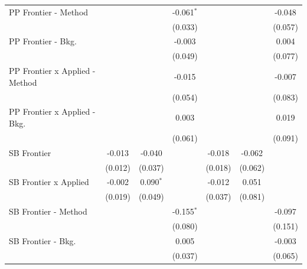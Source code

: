 \begin{tabular}{lcccccc}
   PP Frontier - Method           &              &             & -0.061$^{*}$ &              &                & -0.048\\   
                                  &              &             & (0.033)      &              &                & (0.057)\\   
   PP Frontier - Bkg.             &              &             & -0.003       &              &                & 0.004\\   
                                  &              &             & (0.049)      &              &                & (0.077)\\   
   PP Frontier x Applied - Method &              &             & -0.015       &              &                & -0.007\\   
                                  &              &             & (0.054)      &              &                & (0.083)\\   
   PP Frontier x Applied - Bkg.   &              &             & 0.003        &              &                & 0.019\\   
                                  &              &             & (0.061)      &              &                & (0.091)\\   
   SB Frontier                    & -0.013       & -0.040      &              & -0.018       & -0.062         &   \\   
                                  & (0.012)      & (0.037)     &              & (0.018)      & (0.062)        &   \\   
   SB Frontier x Applied          & -0.002       & 0.090$^{*}$ &              & -0.012       & 0.051          &   \\   
                                  & (0.019)      & (0.049)     &              & (0.037)      & (0.081)        &   \\   
   SB Frontier - Method           &              &             & -0.155$^{*}$ &              &                & -0.097\\   
                                  &              &             & (0.080)      &              &                & (0.151)\\   
   SB Frontier - Bkg.             &              &             & 0.005        &              &                & -0.003\\   
                                  &              &             & (0.037)      &              &                & (0.065)\\   

\end{tabular}
